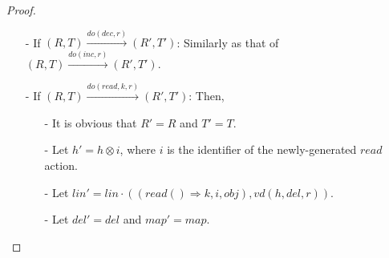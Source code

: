 {\begin {proof}
\begin{itemize}
    Since $\mathit{vd}(h,\mathit{del},r)$ satisfies that, $\forall o_1,o_2 \in \mathit{vd}(h,\mathit{del},r), o_2 \in \mathit{vd}(h,\mathit{del},r) \wedge (o_1,o_2) \in \mathit{vis} \Rightarrow o_1 \in \mathit{vd}(h,\mathit{del},r)$, by Lemma \ref{lemma:a transitive-closed set is a union of visibility of several sets}, we know that there exists a set $O$, such that $\mathit{vd}(h,\mathit{del},r) = \cup_{o \in O} \mathit{vis}^{-1}(o)$. By Lemma \ref{lemma:the view of a replica of one operation is contained in another operaiton, or vice versa} and the construction of $\mathit{ds}$, we can see that $R(r) = (P',N')$, where for each replica $r'$, $P'[r'] = \vert \{ j \in \mathit{vd}(h,\mathit{del},r) \uparrow_{\mathit{inc}}$ and $j$ is of replica $r \} \vert$ and $N'[r'] = \vert \{ j \in \mathit{vd}(h,\mathit{del},r) \uparrow_{\mathit{dec}}$ and $j$ is of replica $r \} \vert$.

    We already know that $\mathit{ds}(i) = (P'',N'')$, where for each replica $r'$, $P''[r'] = \vert \{ j \in \mathit{vd}(h',\mathit{del}',r) \uparrow_{\mathit{inc}}$ and $j$ is of replica $r \} \vert$ and $N''[r'] = \vert \{ j \in \mathit{vd}(h',\mathit{del}',r) \uparrow_{\mathit{dec}}$ and $j$ is of replica $r \} \vert$. Then, it is obvious that $\mathit{merge}(R(r),\mathit{ds}(i)) = \mathit{ds}(i)$. It is also easy to see that $\mathit{ds}(i) = (R(r).P[r: R(r).P(r)+1], R(r).N) = R'(r)$. Therefore, $R'(r) = \mathit{merge}(R(r),\mathit{ds}(i))$.

\item[-] If $(R,T) {\xrightarrow{\mathit{do}(\mathit{dec},r)}} (R',T')$: Similarly as that of $(R,T) {\xrightarrow{\mathit{do}(\mathit{inc},r)}} (R',T')$.

\item[-] If $(R,T) {\xrightarrow{\mathit{do}(\mathit{read},k,r)}} (R',T')$: Then,

    \begin{itemize}
    \setlength{\itemsep}{0.5pt}
    \item[-] It is obvious that $R' = R$ and $T' = T$.

    \item[-] Let $h' = h \otimes i$, where $i$ is the identifier of the newly-generated $\mathit{read}$ action.

    \item[-] Let $\mathit{lin}' = \mathit{lin} \cdot ((\mathit{read}() \Rightarrow k,i,\mathit{obj}), \mathit{vd}(h,\mathit{del},r) )$.

    \item[-] Let $\mathit{del}' = \mathit{del}$ and $\mathit{map}' = \mathit{map}$.
    \end{itemize}


\end{itemize}
\end{proof}}
